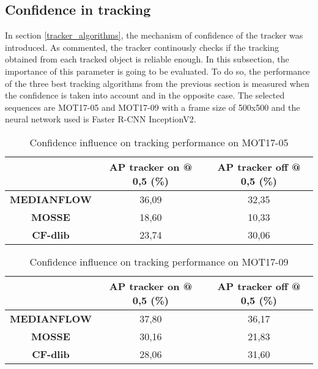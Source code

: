 \subsection{Confidence in tracking}
In section \ref{tracker_algorithms}, the mechanism of confidence of the tracker was introduced. As commented, the tracker continously checks if the tracking obtained from each tracked object is reliable enough. In this subsection, the importance of this parameter is going to be evaluated. To do so, the performance of the three best tracking algorithms from the previous section is measured when the confidence is taken into account and in the opposite case. The selected sequences are MOT17-05 and MOT17-09 with a frame size of 500x500 and the neural network used is Faster R-CNN InceptionV2.\\
\begin{table}[H]
\begin{center}
\begin{tabular}{|c|c|c|}
\hline
\textbf{}           & \textbf{AP tracker on @ 0,5 (\%)} & \textbf{AP tracker off @ 0,5 (\%)} \\ \hline
\textbf{MEDIANFLOW} & 36,09                             & 32,35                              \\ \hline
\textbf{MOSSE}      & 18,60                             & 10,33                              \\ \hline
\textbf{CF-dlib}    & 23,74                             & 30,06                              \\ \hline
\end{tabular}
\end{center}
\caption{Confidence influence on tracking performance on MOT17-05}
\label{tab:tracker_exp_4}
\end{table}
\begin{table}[H]
\begin{center}
\begin{tabular}{|c|c|c|}
\hline
\textbf{}           & \textbf{AP tracker on @ 0,5 (\%)} & \textbf{AP tracker off @ 0,5 (\%)} \\ \hline
\textbf{MEDIANFLOW} & 37,80                             & 36,17                              \\ \hline
\textbf{MOSSE}      & 30,16                             & 21,83                              \\ \hline
\textbf{CF-dlib}    & 28,06                             & 31,60                              \\ \hline
\end{tabular}
\end{center}
\caption{Confidence influence on tracking performance on MOT17-09}
\label{tab:tracker_exp_5}
\end{table}
